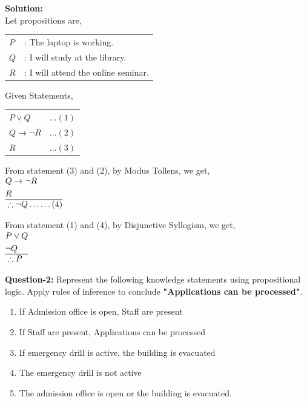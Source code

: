 \textbf{Solution:}\\[1em]
Let propositions are,\\
\begin{tabular}{ll}
   $P$ &: The laptop is working. \\
   $Q$ &: I will study at the library. \\
   $R$ &: I will attend the online seminar. \\
\end{tabular}

Given Statements,\\
\begin{tabular}{ll}
   $P \lor Q$ & $\ldots (1)$\\
   $Q \to \neg R$ & $\ldots (2)$\\
   $R$ & $\ldots (3)$\\
\end{tabular}


From statement (3) and (2), by Modus Tollens, we get,\\
$\begin{aligned}
   & Q \to \neg R \\
   & R \\\hline
   & \therefore \neg Q \ldots\ldots (4) \\
\end{aligned}$

From statement (1) and (4), by Disjunctive Syllogism, we get,\\
$\begin{aligned}
   & P \lor Q \\
   & \neg Q \\\hline
   & \therefore P \\
\end{aligned}$


\textbf{Question-2:} Represent the following knowledge statements using propositional logic. Apply rules of inference to conclude \textbf{"Applications can be processed"}.
\vspace{-\baselineskip}
\begin{enumerate}
   \item If Admission office is open, Staff are present
   \item If Staff are present, Applications can be processed
   \item If emergency drill is active, the building is evacuated
   \item The emergency drill is not active
   \item The admission office is open or the building is evacuated.
\end{enumerate}


